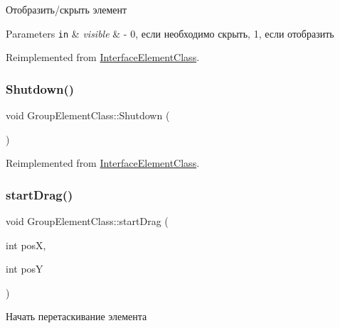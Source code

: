 Отобразить/скрыть элемент 


\begin{DoxyParams}[1]{Parameters}
\mbox{\tt in}  & {\em visible} & -\/ 0, если необходимо скрыть, 1, если отобразить \\
\hline
\end{DoxyParams}


Reimplemented from \hyperlink{class_interface_element_class_ad7981e5bad3db0c073ca1301dee44d6f}{Interface\+Element\+Class}.

\mbox{\label{class_group_element_class_add2c48701e28e7a05fbb0e5aa14e58a3}} 
\subsubsection{\texorpdfstring{Shutdown()}{Shutdown()}}
{\footnotesize\ttfamily void Group\+Element\+Class\+::\+Shutdown (\begin{DoxyParamCaption}{ }\end{DoxyParamCaption})\hspace{0.3cm}{\ttfamily [virtual]}}



Reimplemented from \hyperlink{class_interface_element_class_aa710f6d66c3aa4c2d0a23fdd2b75a1f0}{Interface\+Element\+Class}.

\mbox{\label{class_group_element_class_ad278bfc85cfc469a37ba0292bc944504}} 
\subsubsection{\texorpdfstring{start\+Drag()}{startDrag()}}
{\footnotesize\ttfamily void Group\+Element\+Class\+::start\+Drag (\begin{DoxyParamCaption}\item[{int}]{posX,  }\item[{int}]{posY }\end{DoxyParamCaption})\hspace{0.3cm}{\ttfamily [virtual]}}



Начать перетаскивание элемента 


